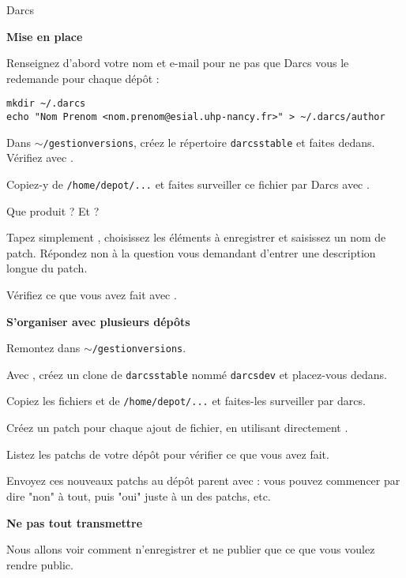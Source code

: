 \documentclass[10pt]{article}\usepackage[nu]{esial}
\begin{document}
\begin{part}{Darcs}

\begin{Exercice} \textbf{Mise en place}

Renseignez d'abord votre nom et e-mail pour ne pas que Darcs vous
le redemande pour chaque dépôt :
\begin{verbatim}
mkdir ~/.darcs
echo "Nom Prenom <nom.prenom@esial.uhp-nancy.fr>" > ~/.darcs/author
\end{verbatim}

Dans {\tt $\sim$/gestionversions}, créez le répertoire {\tt darcsstable} et faites
 dedans. Vérifiez avec .

Copiez-y  de {\tt /home/depot/...} et
faites surveiller ce fichier par Darcs avec .

Que produit  ? Et  ?

Tapez simplement , choisissez les éléments à enregistrer
et saisissez un nom de patch. Répondez non à la question vous demandant d'entrer
une description longue du patch.

Vérifiez ce que vous avez fait avec .
\end{Exercice}

\begin{Exercice}{\bf S'organiser avec plusieurs dépôts}

Remontez dans {\tt $\sim$/gestionversions}.

Avec , créez un clone de {\tt darcsstable} nommé {\tt darcsdev}
et placez-vous dedans.

Copiez les fichiers  et  de {\tt /home/depot/...} et
faites-les surveiller par darcs.

Créez un patch pour chaque ajout de fichier, en utilisant directement
.

Listez les patchs de votre dépôt pour vérifier ce que vous avez fait.

Envoyez ces nouveaux patchs au dépôt parent avec  :
vous pouvez commencer par dire "non" à tout, puis "oui" juste à un des patchs,
etc.
\end{Exercice}

\begin{Exercice}{\bf Ne pas tout transmettre}

Nous allons voir comment n'enregistrer et ne publier que ce que vous voulez
rendre public.


\end{Exercice}
\end{part}
\end{document}

